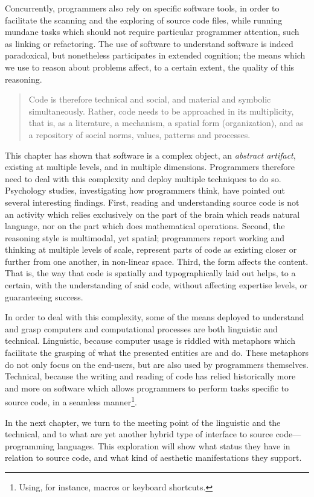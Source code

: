 Concurrently, programmers also rely on specific software tools, in order to facilitate the scanning and the exploring of source code files, while running mundane tasks which should not require particular programmer attention, such as linking or refactoring. The use of software to understand software is indeed paradoxical, but nonetheless participates in extended cognition; the means which we use to reason about problems affect, to a certain extent, the quality of this reasoning.

\spacer

\begin{quote}
    Code is therefore technical and social, and material and symbolic simultaneously. Rather, code needs to be approached in its multiplicity, that is, as a literature, a mechanism, a spatial form (organization), and as a repository of social norms, values, patterns and processes. \citep{berry_philosophy_2011}
\end{quote}

This chapter has shown that software is a complex object, an \emph{abstract artifact}, existing at multiple levels, and in multiple dimensions. Programmers therefore need to deal with this complexity and deploy multiple techniques to do so. Psychology studies, investigating how programmers think, have pointed out several interesting findings. First, reading and understanding source code is not an activity which relies exclusively on the part of the brain which reads natural language, nor on the part which does mathematical operations. Second, the reasoning style is multimodal, yet spatial; programmers report working and thinking at multiple levels of scale, represent parts of code as existing closer or further from one another, in non-linear space. Third, the form affects the content. That is, the way that code is spatially and typographically laid out helps, to a certain, with the understanding of said code, without affecting expertise levels, or guaranteeing success.

In order to deal with this complexity, some of the means deployed to understand and grasp computers and computational processes are both linguistic and technical. Linguistic, because computer usage is riddled with metaphors which facilitate the grasping of what the presented entities are and do. These metaphors do not only focus on the end-users, but are also used by programmers themselves. Technical, because the writing and reading of code has relied historically more and more on software which allows programmers to perform tasks specific to source code, in a seamless manner\footnote{Using, for instance, macros or keyboard shortcuts.}.

In the next chapter, we turn to the meeting point of the linguistic and the technical, and to what are yet another hybrid type of interface to source code—programming languages. This exploration will show what status they have in relation to source code, and what kind of aesthetic manifestations they support.
